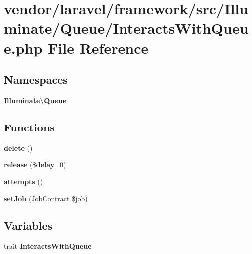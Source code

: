 \section{vendor/laravel/framework/src/\+Illuminate/\+Queue/\+Interacts\+With\+Queue.php File Reference}
\label{_interacts_with_queue_8php}
\subsection*{Namespaces}
\begin{DoxyCompactItemize}
\item 
 {\bf Illuminate\textbackslash{}\+Queue}
\end{DoxyCompactItemize}
\subsection*{Functions}
\begin{DoxyCompactItemize}
\item 
{\bf delete} ()
\item 
{\bf release} (\${\bf delay}=0)
\item 
{\bf attempts} ()
\item 
{\bf set\+Job} (Job\+Contract \$job)
\end{DoxyCompactItemize}
\subsection*{Variables}
\begin{DoxyCompactItemize}
\item 
trait {\bf Interacts\+With\+Queue}
\end{DoxyCompactItemize}
